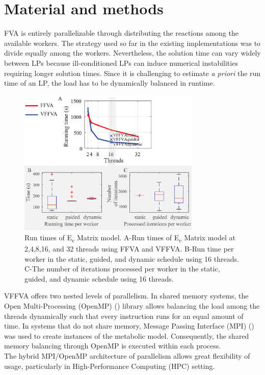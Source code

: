\documentclass{bioinfo}
\begin{document}

\section{Material and methods}

FVA is entirely parallelizable through distributing the reactions among the available workers. The strategy used so far in the existing implementations was to divide equally among the workers. Nevertheless, the solution time can vary widely between LPs because ill-conditioned LPs can induce numerical instabilities requiring longer solution times. Since it is challenging to estimate \textit{a priori} the run time of an LP, the load has to be dynamically balanced in runtime.\\
\begin{figure}[h]%
\includegraphics[width=\textwidth,height=7cm,keepaspectratio]{schedule.eps}
\caption[Run times of E\textsubscript{c} \textunderscore Matrix model.]{Run times of E\textsubscript{c} \textunderscore Matrix model. A-Run times of E\textsubscript{c} \textunderscore Matrix model at 2,4,8,16, and 32 threads using FFVA and VFFVA. B-Run time per worker in the static, guided, and dynamic schedule using 16 threads. C-The number of iterations processed per worker in the static, guided, and dynamic schedule using 16 threads.}\label{fig:static.}
\end{figure}
\noindent VFFVA offers two nested levels of parallelism. In shared memory systems, the Open Multi-Processing (OpenMP) (\citealp{dagum1998openmp}) library allows balancing the load among the threads dynamically such that every instruction runs for an equal amount of time. In systems that do not share memory, Message Passing Interface (MPI) (\citealp{message2012mpi}) was used to create instances of the metabolic model. Consequently, the shared memory balancing through OpenMP is executed within each process.\\
The hybrid MPI/OpenMP architecture of parallelism allows great flexibility of usage, particularly in High-Performance Computing (HPC) setting.
\end{document}
